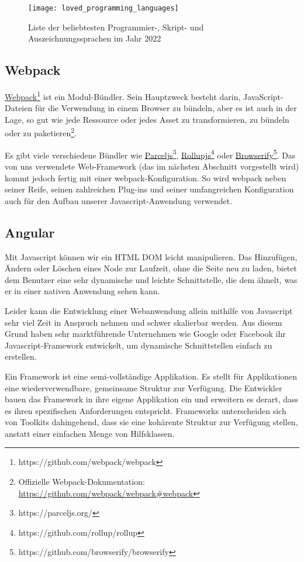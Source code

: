 \begin{figure}[h]
  \centering
  \texttt{[image: loved\_programming\_languages]}
  \caption{Liste der beliebtesten Programmier-, Skript- und Auszeichnungssprachen im Jahr 2022}
  \label{fig:spa}
\end{figure}

\subsection{Webpack}
\href{https://github.com/webpack/webpack}{Webpack}\footnote{https://github.com/webpack/webpack} ist ein Modul-Bündler.
Sein Hauptzweck besteht darin, JavaScript-Dateien für die Verwendung in einem Browser zu bündeln, aber es ist auch in der Lage, so gut wie jede Ressource oder jedes Asset zu transformieren, zu bündeln oder zu {paketieren}\footnote{Offizielle Webpack-Dokumentation: \href{https://github.com/webpack/webpack\#webpack}{https://github.com/webpack/webpack\#webpack}}.

Es gibt viele verschiedene Bündler wie \href{https://parceljs.org/}{Parceljs}\footnote{https://parceljs.org/}, \href{https://github.com/rollup/rollup}{Rollupjs}\footnote{https://github.com/rollup/rollup} oder \href{https://github.com/browserify/browserify}{Browserify}\footnote{https://github.com/browserify/browserify}.
Das von uns verwendete Web-Framework (das im nächsten Abschnitt vorgestellt wird) kommt jedoch fertig mit einer webpack-Konfiguration.
So wird webpack neben seiner Reife, seinen zahlreichen Plug-ins und seiner umfangreichen Konfiguration auch für den Aufbau unserer Javascript-Anwendung verwendet.

\subsection{Angular}
Mit Javascript können wir ein HTML DOM leicht manipulieren. Das Hinzufügen, Ändern oder Löschen eines Node zur Laufzeit, ohne die Seite neu zu laden, bietet dem Benutzer eine sehr dynamische und leichte Schnittstelle, die dem ähnelt, was er in einer nativen Anwendung sehen kann.

Leider kann die Entwicklung einer Webanwendung allein mithilfe von Javascript sehr viel Zeit in Anspruch nehmen und schwer skalierbar werden.
Aus diesem Grund haben sehr marktführende Unternehmen wie Google oder Facebook ihr Javascript-Framework entwickelt, um dynamische Schnittstellen einfach zu erstellen.

Ein Framework ist eine semi-vollständige Applikation. Es stellt für Applikationen eine wiederverwendbare, gemeinsame Struktur zur Verfügung.
Die Entwickler bauen das Framework in ihre eigene Applikation ein und erweitern es derart, dass es ihren spezifischen Anforderungen entspricht.
Frameworks unterscheiden sich von Toolkits dahingehend, dass sie eine kohärente Struktur zur Verfügung stellen, anstatt einer einfachen Menge von Hilfsklassen\cite{DesigningReusableClasses}.

